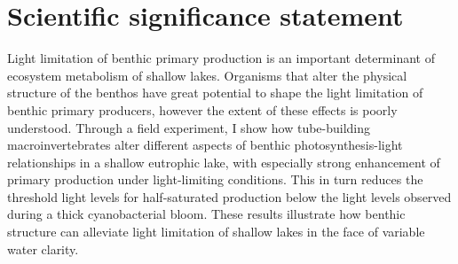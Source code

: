 
\section*{Scientific significance statement}

Light limitation of benthic primary production is an important determinant of 
ecosystem metabolism of shallow lakes.
Organisms that alter the physical structure of the benthos have great potential 
to shape the light limitation of benthic primary producers,
however the extent of these effects is poorly understood.
Through a field experiment, I show how tube-building 
macroinvertebrates alter different aspects of benthic photosynthesis-light relationships
in a shallow eutrophic lake, 
with especially strong enhancement of primary production under light-limiting conditions. 
This in turn reduces the threshold light levels for half-saturated production
below the light levels observed during a thick cyanobacterial bloom.
These results illustrate how benthic structure can alleviate light limitation 
of shallow lakes in the face of variable water clarity.



